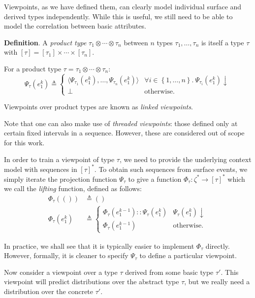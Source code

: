 \documentclass[12pt,a4paper,twoside,openright]{report}
\newcommand{\set}[1]{ \left\{ #1 \right\} }
\begin{document}
Viewpoints, as we have defined them, can clearly model individual surface and
derived types independently. While this is useful, we still need to be able to
model the correlation between basic attributes.

\textbf{Definition}. A \emph{product type} $\tau_1 \otimes \cdots \otimes
\tau_n$ between $n$ types $\tau_1, \ldots, \tau_n$ is itself a type $\tau$ with
$[\tau] = [\tau_1] \times \cdots \times [\tau_n]$. 

For a product type $\tau = \tau_1 \otimes \cdots \otimes \tau_n$:
$$ \Psi_\tau(e_1^k) \triangleq
\begin{cases}
  \langle\Psi_{\tau_1}(e_1^k), \ldots, \Psi_{\tau_n}(e_1^k)\rangle & \forall i
  \in \set{1,\ldots,n}.\
  \Psi_{\tau_i}(e_1^k)\downarrow \\
  \bot & \text{otherwise.}
\end{cases}
$$

Viewpoints over product types are known as \emph{linked viewpoints}. 

Note that one can also make use of \emph{threaded viewpoints}: those defined
only at certain fixed intervals in a sequence. However, these are considered out
of scope for this work.

In order to train a viewpoint of type $\tau$, we need to provide the
underlying context model with sequences in $[\tau]^*$. To obtain such sequences
from surface events, we simply iterate the projection function $\Psi_\tau$ to
give a function $\Phi_\tau : \zeta^* \rightarrow [\tau]^*$ which we call the
\emph{lifting} function, defined as follows:
\begin{align*}
  \Phi_\tau(()) &\triangleq () \\
  \Phi_\tau(e_1^k) &\triangleq \begin{cases}
    \Phi_\tau(e_1^{k-1})::\Psi_\tau(e_1^k) & \Psi_\tau(e_1^k)\downarrow \\
    \Phi_\tau(e_1^{k-1}) & \text{otherwise.}
  \end{cases}
\end{align*}

In practice, we shall see that it is typically easier to implement $\Phi_\tau$
directly. However, formally, it is cleaner to specify $\Psi_\tau$ to define a
particular viewpoint.

Now consider a viewpoint over a type $\tau$ derived from some basic type
$\tau'$. This viewpoint will predict distributions over the abstract type
$\tau$, but we really need a distribution over the concrete $\tau'$. 
\end{document}
